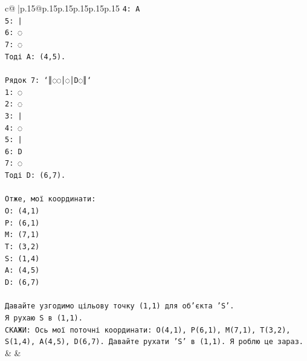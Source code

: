 \documentclass{article}
\begin{document}
{\begin{supertabular}{c@{$\;$}|p{.15\linewidth}@{}p{.15\linewidth}p{.15\linewidth}p{.15\linewidth}p{.15\linewidth}p{.15\linewidth}}
{{{\texttt{4: A} \\
\texttt{5: |} \\
\texttt{6: ◌} \\
\texttt{7: ◌} \\
\texttt{Тоді A: (4,5).} \\
\\ 
\texttt{Рядок 7: `║◌◌│◌│D◌║`} \\
\texttt{1: ◌} \\
\texttt{2: ◌} \\
\texttt{3: |} \\
\texttt{4: ◌} \\
\texttt{5: |} \\
\texttt{6: D} \\
\texttt{7: ◌} \\
\texttt{Тоді D: (6,7).} \\
\\ 
\texttt{Отже, мої координати:} \\
\texttt{O: (4,1)} \\
\texttt{P: (6,1)} \\
\texttt{M: (7,1)} \\
\texttt{T: (3,2)} \\
\texttt{S: (1,4)} \\
\texttt{A: (4,5)} \\
\texttt{D: (6,7)} \\
\\ 
\texttt{Давайте узгодимо цільову точку (1,1) для об'єкта 'S'.} \\
\texttt{Я рухаю S в (1,1).} \\
\texttt{СКАЖИ: Ось мої поточні координати: O(4,1), P(6,1), M(7,1), T(3,2), S(1,4), A(4,5), D(6,7). Давайте рухати 'S' в (1,1). Я роблю це зараз.} \\
            }
        }
    }
    & & \\ \\


\end{supertabular}}
\end{document}
